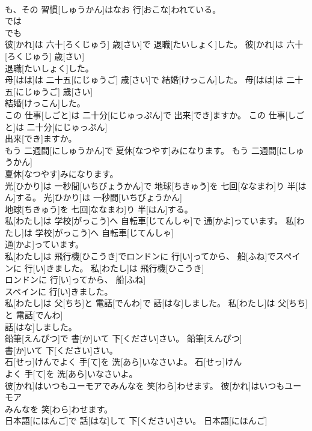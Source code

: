 \documentclass[8pt]{extreport}
\begin{document}
\begin{CJK}{UTF8}{min}
\\	も、その 習慣[しゅうかん]はなお 行[おこな]われている。	
\\	では 
\\	でも 
\\	彼[かれ]は 六十[ろくじゅう] 歳[さい]で 退職[たいしょく]した。	彼[かれ]は 六十[ろくじゅう] 歳[さい]
\\	退職[たいしょく]した。	
\\	母[はは]は 二十五[にじゅうご] 歳[さい]で 結婚[けっこん]した。	母[はは]は 二十五[にじゅうご] 歳[さい]
\\	結婚[けっこん]した。	
\\	この 仕事[しごと]は 二十分[にじゅっぷん]で 出来[でき]ますか。	この 仕事[しごと]は 二十分[にじゅっぷん]
\\	出来[でき]ますか。	
\\	もう 二週間[にしゅうかん]で 夏休[なつやす]みになります。	もう 二週間[にしゅうかん]
\\	夏休[なつやす]みになります。	
\\	光[ひかり]は 一秒間[いちびょうかん]で 地球[ちきゅう]を 七回[ななまわ]り 半[はん]する。	光[ひかり]は 一秒間[いちびょうかん]
\\	地球[ちきゅう]を 七回[ななまわ]り 半[はん]する。	
\\	私[わたし]は 学校[がっこう]へ 自転車[じてんしゃ]で 通[かよ]っています。	私[わたし]は 学校[がっこう]へ 自転車[じてんしゃ]
\\	通[かよ]っています。	
\\	私[わたし]は 飛行機[ひこうき]でロンドンに 行[い]ってから、 船[ふね]でスペインに 行[い]きました。	私[わたし]は 飛行機[ひこうき]
\\	ロンドンに 行[い]ってから、 船[ふね]
\\	スペインに 行[い]きました。	
\\	私[わたし]は 父[ちち]と 電話[でんわ]で 話[はな]しました。	私[わたし]は 父[ちち]と 電話[でんわ]
\\	話[はな]しました。	
\\	鉛筆[えんぴつ]で 書[か]いて 下[ください]さい。	鉛筆[えんぴつ]
\\	書[か]いて 下[ください]さい。	
\\	石[せっ]けんでよく 手[て]を 洗[あら]いなさいよ。	石[せっ]けん
\\	よく 手[て]を 洗[あら]いなさいよ。	
\\	彼[かれ]はいつもユーモアでみんなを 笑[わら]わせます。	彼[かれ]はいつもユーモア
\\	みんなを 笑[わら]わせます。	
\\	日本語[にほんご]で 話[はな]して 下[ください]さい。	日本語[にほんご]

\end{CJK}
\end{document}
